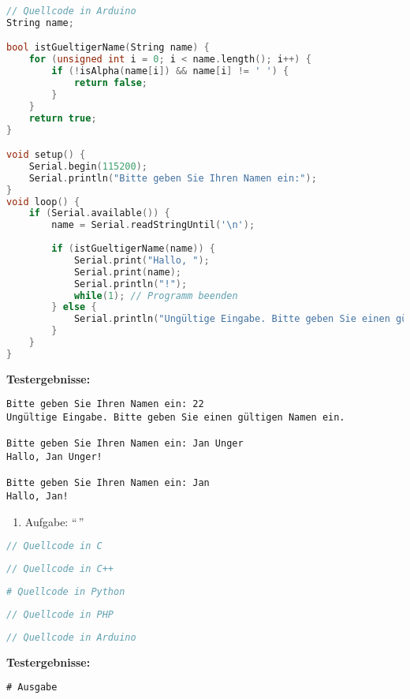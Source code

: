 \documentclass[12pt,a4paper]{scrartcl}
\newcommand{\tightlist}{
  \setlength{\itemsep}{0pt}\setlength{\parskip}{0pt}
}
\begin{document}
\begin{lstlisting}[language={C++}]
// Quellcode in Arduino
String name;

bool istGueltigerName(String name) {
    for (unsigned int i = 0; i < name.length(); i++) {
        if (!isAlpha(name[i]) && name[i] != ' ') {
            return false;
        }
    }
    return true;
}

void setup() {
    Serial.begin(115200);
    Serial.println("Bitte geben Sie Ihren Namen ein:");
}
void loop() {
    if (Serial.available()) {
        name = Serial.readStringUntil('\n');
        
        if (istGueltigerName(name)) {
            Serial.print("Hallo, ");
            Serial.print(name);
            Serial.println("!");
            while(1); // Programm beenden
        } else {
            Serial.println("Ungültige Eingabe. Bitte geben Sie einen gültigen Namen ein.");
        }
    }
}
\end{lstlisting}

\textbf{Testergebnisse:}

\begin{lstlisting}
Bitte geben Sie Ihren Namen ein: 22
Ungültige Eingabe. Bitte geben Sie einen gültigen Namen ein.

Bitte geben Sie Ihren Namen ein: Jan Unger
Hallo, Jan Unger!

Bitte geben Sie Ihren Namen ein: Jan
Hallo, Jan!
\end{lstlisting}

\begin{enumerate}
\def\labelenumi{\arabic{enumi}.}
\setcounter{enumi}{1}
\tightlist
\item
  Aufgabe: ``\,''
\end{enumerate}

\begin{lstlisting}[language=C]
// Quellcode in C
\end{lstlisting}

\begin{lstlisting}[language={C++}]
// Quellcode in C++
\end{lstlisting}

\begin{lstlisting}[language=Python]
# Quellcode in Python
\end{lstlisting}

\begin{lstlisting}[language=PHP]
// Quellcode in PHP
\end{lstlisting}

\begin{lstlisting}[language={C++}]
// Quellcode in Arduino
\end{lstlisting}

\textbf{Testergebnisse:}

\begin{lstlisting}
# Ausgabe
\end{lstlisting}
\end{document}
